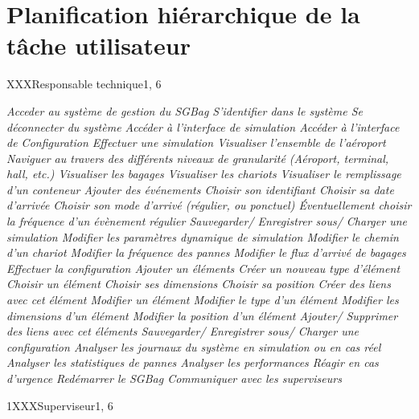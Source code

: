 \newpage
\part{Planification hiérarchique de la tâche utilisateur}

\phtu
{XXX}{Responsable technique}{1, 6}
{
\begin{tabular}
	\it{} Acceder au système de gestion du SGBag
		\sit{} S'identifier dans le système
		\sit{} Se déconnecter du système
		\sit{} Accéder à l'interface de simulation
		\sit{} Accéder à l'interface de Configuration
	\it{} Effectuer une simulation
		\sit{} Visualiser l'ensemble de l'aéroport
			\ssit{} Naviguer au travers des différents niveaux de granularité (Aéroport, terminal, hall, \textsl{etc.})
			\ssit{} Visualiser les bagages
			\ssit{} Visualiser les chariots
			\ssit{} Visualiser le remplissage d'un conteneur
		\sit{} Ajouter des événements
			\ssit{} Choisir son identifiant
			\ssit{} Choisir sa date d'arrivée
			\ssit{} Choisir son mode d'arrivé (régulier, ou ponctuel)
			\ssit{} Éventuellement choisir la fréquence d'un évènement régulier
		\sit{} Sauvegarder/ Enregistrer sous/ Charger une simulation
		\sit{} Modifier les paramètres dynamique de simulation
			\ssit{} Modifier le chemin d'un chariot	
			\ssit{} Modifier la fréquence des pannes
			\ssit{} Modifier le flux d'arrivé de bagages
	\it{} Effectuer la configuration
		\sit{} Ajouter un éléments 
			\ssit{} Créer un nouveau type d'élément
			\ssit{} Choisir un élément
			\ssit{} Choisir ses dimensions
			\ssit{} Choisir sa position
			\ssit{} Créer des liens avec cet élément
		\sit{} Modifier un élément
			\ssit{} Modifier le type d'un élément
			\ssit{} Modifier les dimensions d'un élément
			\ssit{} Modifier la position d'un élément
			\ssit{} Ajouter/ Supprimer des liens avec cet éléments
		\sit{} Sauvegarder/ Enregistrer sous/ Charger une configuration
	\it{} Analyser les journaux du système en simulation ou en cas réel
		\sit{} Analyser les statistiques de pannes
		\sit{} Analyser les performances
	\it{} Réagir en cas d'urgence 
		\sit{} Redémarrer le SGBag
		\sit{} Communiquer avec les superviseurs
\end{tabular}
}

\phtu
{1}{XXX}{Superviseur}{1, 6}
{
	\it{}
}

